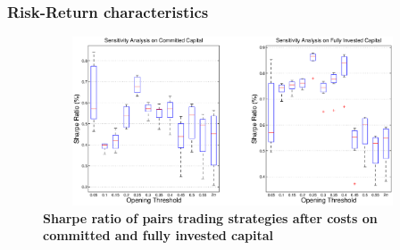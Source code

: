 \documentclass[pdf,10pt,xcolor=dvipsnames,hide notes]{beamer}
\begin{document}
\begin{frame}
	\frametitle{Risk-Return characteristics}
	
	\begin{figure}[!ht]
		\centering
		\includegraphics[width=12cm,height=5cm]{Figure2.eps}
		\captionsetup{justification=raggedright,
			singlelinecheck=false
		}
		\caption{\textbf {Sharpe ratio of pairs trading strategies after costs on committed and fully invested capital}}
		\label{fig:fig2}
	\end{figure}
	
\end{frame}
\end{document}
